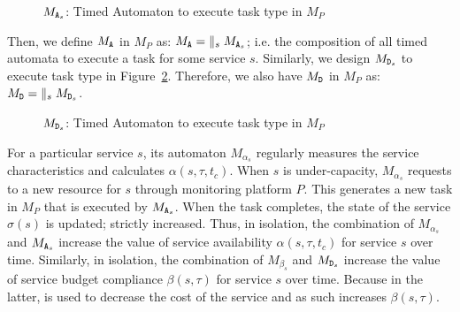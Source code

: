 \begin{figure}[h]
\centering
{}
\caption{$M_{{\scriptsize\texttt{A}}_s}$: Timed Automaton to execute task type  in $M_P$}
\label{ch04:fig:fsm:alloc_s}
\end{figure}

Then, we define $M_{{\scriptsize\texttt{A}}}$ in $M_P$ as:
$M_{{\scriptsize\texttt{A}}} = \; \parallel_s M_{{\scriptsize\texttt{A}}_s}$; i.e.
the composition of all timed automata to execute a task  for some service $s$.
% 
Similarly, we design $M_{{\scriptsize\texttt{D}}_s}$ to execute task type  in Figure~\ref{ch04:fig:fsm:dealloc_s}.
Therefore, we also have $M_{{\scriptsize\texttt{D}}}$ in $M_P$ as: $M_{{\scriptsize\texttt{D}}} = \; \parallel_s M_{{\scriptsize\texttt{D}}_s}$.
% 
\begin{figure}[h!]
\centering
{}
\caption{$M_{{\scriptsize\texttt{D}}_s}$: Timed Automaton to execute task type  in $M_P$}
\label{ch04:fig:fsm:dealloc_s}
\end{figure}
% 

For a particular service $s$, its automaton $M_{\alpha_s}$ regularly measures the service
characteristics and calculates $\alpha(s,\tau,t_c)$. When $s$ is under-capacity, $M_{\alpha_s}$ requests to  a new resource for $s$ through monitoring platform $P$.
This generates a new task in $M_P$ that is executed by $M_{{\scriptsize\texttt{A}}_s}$.
When the task completes, the state of the service $\sigma(s)$ is updated; strictly increased.
Thus, in isolation, the combination of $M_{\alpha_s}$ and $M_{{\scriptsize\texttt{A}}_s}$ increase the value of service availability $\alpha(s,\tau,t_c)$ for service $s$ over time.
Similarly, in isolation, the combination of $M_{\beta_s}$ and $M_{{\scriptsize\texttt{D}}_s}$ increase the value of service budget compliance $\beta(s,\tau)$ for service $s$ over time. 
Because in the latter,  is used to decrease the cost of the service and as such increases $\beta(s,\tau)$. 

